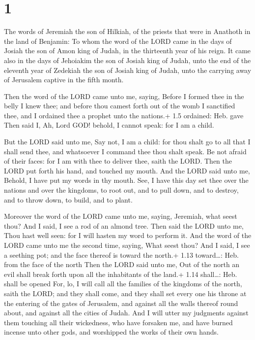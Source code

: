 \hypertarget{section}{%
\section{1}\label{section}}

 The words of Jeremiah the son of Hilkiah, of the priests
that were in Anathoth in the land of Benjamin:  To whom the
word of the LORD came in the days of Josiah the son of Amon king of
Judah, in the thirteenth year of his reign.  It came also in
the days of Jehoiakim the son of Josiah king of Judah, unto the end of
the eleventh year of Zedekiah the son of Josiah king of Judah, unto the
carrying away of Jerusalem captive in the fifth month.

 Then the word of the LORD came unto me, saying,
 Before I formed thee in the belly I knew thee; and before
thou camest forth out of the womb I sanctified thee, and I ordained thee
a prophet unto the nations.+ 1.5 ordained: Heb. gave  Then
said I, Ah, Lord GOD! behold, I cannot speak: for I am a child.

 But the LORD said unto me, Say not, I am a child: for
thou shalt go to all that I shall send thee, and whatsoever I command
thee thou shalt speak.  Be not afraid of their faces: for I
am with thee to deliver thee, saith the LORD.  Then the LORD
put forth his hand, and touched my mouth. And the LORD said unto me,
Behold, I have put my words in thy mouth.  See, I have this
day set thee over the nations and over the kingdoms, to root out, and to
pull down, and to destroy, and to throw down, to build, and to plant.

 Moreover the word of the LORD came unto me, saying,
Jeremiah, what seest thou? And I said, I see a rod of an almond tree.
 Then said the LORD unto me, Thou hast well seen: for I
will hasten my word to perform it.  And the word of the
LORD came unto me the second time, saying, What seest thou? And I said,
I see a seething pot; and the face thereof is toward the north.+ 1.13
toward\ldots: Heb. from the face of the north  Then the
LORD said unto me, Out of the north an evil shall break forth upon all
the inhabitants of the land.+ 1.14 shall\ldots: Heb. shall be opened
 For, lo, I will call all the families of the kingdoms of
the north, saith the LORD; and they shall come, and they shall set every
one his throne at the entering of the gates of Jerusalem, and against
all the walls thereof round about, and against all the cities of Judah.
 And I will utter my judgments against them touching all
their wickedness, who have forsaken me, and have burned incense unto
other gods, and worshipped the works of their own hands.

